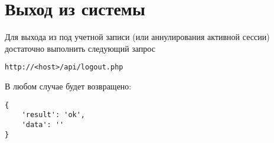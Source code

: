 \section{Выход из системы}
\par
Для выхода из под учетной записи (или аннулирования активной сессии) 
достаточно выполнить следующий запрос \\
\begin{Verbatim}[frame=single]
http://<host>/api/logout.php
\end{Verbatim}
\par
В любом случае будет возвращено:  \\
\begin{Verbatim}[frame=single]
{
    'result': 'ok',
    'data': ''
}
\end{Verbatim}